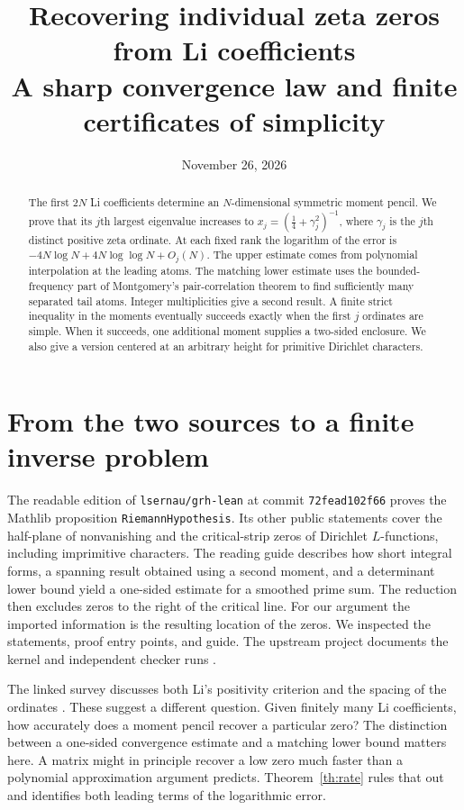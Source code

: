 \documentclass[11pt]{article}
\title{Recovering individual zeta zeros from Li coefficients\\[4pt]
\large A sharp convergence law and finite certificates of simplicity}
\author{}
\date{November 26, 2026}
\begin{document}
\maketitle\vspace{-1.8em}
\begin{abstract}
The first $2N$ Li coefficients determine an $N$-dimensional symmetric moment pencil. We prove that its $j$th largest eigenvalue increases to $x_j=(\tfrac14+\gamma_j^2)^{-1}$, where $\gamma_j$ is the $j$th distinct positive zeta ordinate. At each fixed rank the logarithm of the error is $-4N\log N+4N\log\log N+O_j(N)$. The upper estimate comes from polynomial interpolation at the leading atoms. The matching lower estimate uses the bounded-frequency part of Montgomery's pair-correlation theorem to find sufficiently many separated tail atoms. Integer multiplicities give a second result. A finite strict inequality in the moments eventually succeeds exactly when the first $j$ ordinates are simple. When it succeeds, one additional moment supplies a two-sided enclosure. We also give a version centered at an arbitrary height for primitive Dirichlet characters.
\end{abstract}

\section{From the two sources to a finite inverse problem}
The readable edition of \texttt{lsernau/grh-lean} at commit \texttt{72fead102f66} proves the Mathlib proposition \texttt{RiemannHypothesis}. Its other public statements cover the half-plane of nonvanishing and the critical-strip zeros of Dirichlet $L$-functions, including imprimitive characters. The reading guide describes how short integral forms, a spanning result obtained using a second moment, and a determinant lower bound yield a one-sided estimate for a smoothed prime sum. The reduction then excludes zeros to the right of the critical line. For our argument the imported information is the resulting location of the zeros. We inspected the statements, proof entry points, and guide. The upstream project documents the kernel and independent checker runs \cite{repo}.

The linked survey discusses both Li's positivity criterion and the spacing of the ordinates \cite{wiki}. These suggest a different question. Given finitely many Li coefficients, how accurately does a moment pencil recover a particular zero? The distinction between a one-sided convergence estimate and a matching lower bound matters here. A matrix might in principle recover a low zero much faster than a polynomial approximation argument predicts. Theorem~\ref{th:rate} rules that out and identifies both leading terms of the logarithmic error.
\end{document}
